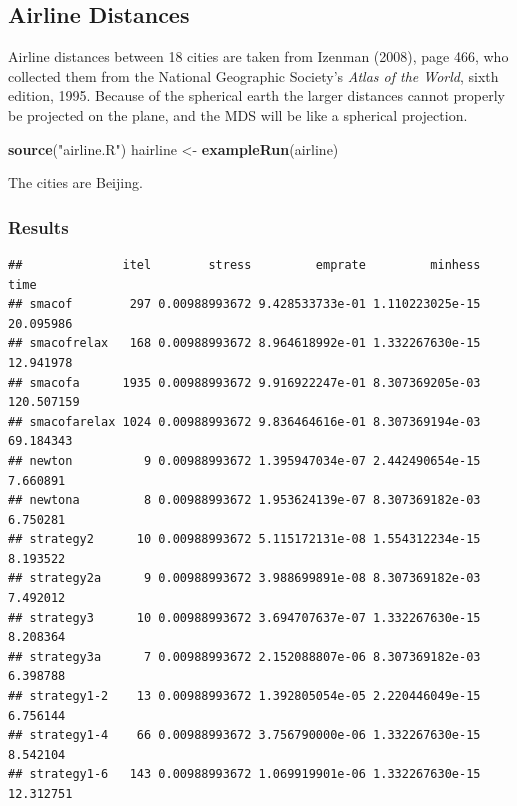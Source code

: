 \documentclass[
  12pt,
]{article}
\newenvironment{Shaded}{\begin{snugshade}}{\end{snugshade}}
\newcommand{\FunctionTok}[1]{\textcolor[rgb]{0.13,0.29,0.53}{\textbf{#1}}}
\newcommand{\NormalTok}[1]{#1}
\newcommand{\OtherTok}[1]{\textcolor[rgb]{0.56,0.35,0.01}{#1}}
\newcommand{\StringTok}[1]{\textcolor[rgb]{0.31,0.60,0.02}{#1}}
\begin{document}
\subsection{Airline Distances}\label{airline-distances}

Airline distances between 18 cities are taken from Izenman (2008), page 466, who collected them from the National Geographic Society's \emph{Atlas of the World}, sixth edition, 1995. Because of the spherical earth the larger distances cannot properly be
projected on the plane, and the MDS will be like a spherical projection.

\begin{Shaded}
\begin{Highlighting}[]
\FunctionTok{source}\NormalTok{(}\StringTok{"airline.R"}\NormalTok{)}
\NormalTok{hairline }\OtherTok{\textless{}{-}} \FunctionTok{exampleRun}\NormalTok{(airline)}
\end{Highlighting}
\end{Shaded}

The cities are Beijing.

\subsubsection{Results}\label{results-7}

\begin{verbatim}
##              itel        stress         emprate         minhess       time
## smacof        297 0.00988993672 9.428533733e-01 1.110223025e-15  20.095986
## smacofrelax   168 0.00988993672 8.964618992e-01 1.332267630e-15  12.941978
## smacofa      1935 0.00988993672 9.916922247e-01 8.307369205e-03 120.507159
## smacofarelax 1024 0.00988993672 9.836464616e-01 8.307369194e-03  69.184343
## newton          9 0.00988993672 1.395947034e-07 2.442490654e-15   7.660891
## newtona         8 0.00988993672 1.953624139e-07 8.307369182e-03   6.750281
## strategy2      10 0.00988993672 5.115172131e-08 1.554312234e-15   8.193522
## strategy2a      9 0.00988993672 3.988699891e-08 8.307369182e-03   7.492012
## strategy3      10 0.00988993672 3.694707637e-07 1.332267630e-15   8.208364
## strategy3a      7 0.00988993672 2.152088807e-06 8.307369182e-03   6.398788
## strategy1-2    13 0.00988993672 1.392805054e-05 2.220446049e-15   6.756144
## strategy1-4    66 0.00988993672 3.756790000e-06 1.332267630e-15   8.542104
## strategy1-6   143 0.00988993672 1.069919901e-06 1.332267630e-15  12.312751
\end{verbatim}
\end{document}
